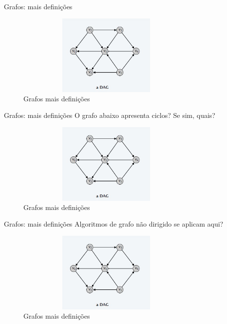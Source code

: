 \begin{frame}
	\begin{block}{Grafos: mais definições}
		\begin{figure}[!htb]
			\centering	  
			\includegraphics[height=4cm, width = 9cm]{./pic/DAGSemCiclo.jpg}
			\caption{Grafos mais definições \cite{GEEKS_2018}}
		\end{figure}
	\end{block}
\end{frame}

\begin{frame}
	\begin{block}{Grafos: mais definições}
		O grafo abaixo apresenta ciclos? Se sim, quais? 
		\begin{figure}[!htb]
			\centering	  
			\includegraphics[height=4cm, width = 9cm]{./pic/DAGSemCiclo.jpg}
			\caption{Grafos mais definições \cite{GEEKS_2018}}
		\end{figure}
	\end{block}
\end{frame}

\begin{frame}
	\begin{block}{Grafos: mais definições}
		Algoritmos de grafo não dirigido se aplicam aqui?
		\begin{figure}[!htb]
			\centering	  
			\includegraphics[height=4cm, width = 9cm]{./pic/DAGSemCiclo.jpg}
			\caption{Grafos mais definições \cite{GEEKS_2018}}
		\end{figure}
	\end{block}
\end{frame}

